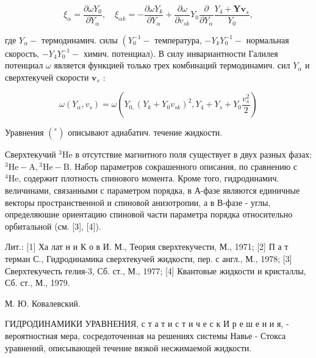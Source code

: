 \documentclass[10pt]{article}
\begin{document}
\[

\xi_{\alpha}=\frac{\partial \omega Y_{0}}{\partial Y_{\alpha}}, \quad \xi_{\alpha k}=-\frac{\partial \omega Y_{k}}{\partial Y_{\alpha}}+\frac{\partial \omega}{\partial v_{s k}} Y_{0} \frac{\partial}{\partial Y_{\alpha}} \frac{Y_{4}+\boldsymbol{Y v}_{s}}{Y_{0}},

\]



где $Y_{\alpha}-$ термодинамич. силы $\left(Y_{0}^{-1}-\right.$ температура, $-Y_{k} Y_{0}^{-1}-$ нормальная скорость, $-Y_{4} Y_{0}^{-1}-$ химич. потенциал). В силу инвариантности Галилея потенциал $\omega$ является функцией только трех комбинаций термодинамич. сил $Y_{\alpha}$ и сверхтекучей скорости $\boldsymbol{v}_{s}$ :



\[

\omega\left(Y_{\alpha}, v_{s}\right)=\omega\left(Y_{0,}\left(Y_{k}+Y_{0} v_{s k}\right)^{2}, Y_{4}+Y_{s}+Y_{0} \frac{v_{s}^{2}}{2}\right)

\]



Уравнения $\left({ }^{*}\right)$ описывают адиабатич. течение жидкости.



Сверхтекучий ${ }^{3} \mathrm{He}$ в отсутствие магнитного поля существует в двух разных фазах: ${ }^{3} \mathrm{He}-\mathrm{A},{ }^{3} \mathrm{He}-\mathrm{B}$. Набор параметров сокрашенного описания, по сравнению с ${ }^{4} \mathrm{He}$, содержит плотность спинового момента. Кроме того, гидродинамич. величинами, связанными с параметром порядка, в А-фазе являются единичные векторы пространственной и спиновой анизотропии, а в В-фазе - углы, определяюшие ориентацию спиновой части параметра порядка относительно орбитальной (см. [3], [4]).



Лит.: [1] Ха лат н и К о в И. М., Теория сверхтекучести, М., 1971; [2] П а т терман С., Гидродинамика сверхтекучей жидкости, пер. с англ., М., 1978; [3] Сверхтекучесть гелия-3, Сб. ст., М., 1977; [4] Квантовые жидкости и кристаллы, Сб. ст., М., 1979.



М. Ю. Ковалевский.



ГИДРОДИНАМИКИ УРАВНЕНИЯ, с т а т и с т и ч е с к И р е ш е н и я, - вероятностная мера, сосредоточенная на решениях системы Навье - Стокса уравнений, описывающей течение вязкой несжимаемой жидкости.
\end{document}
